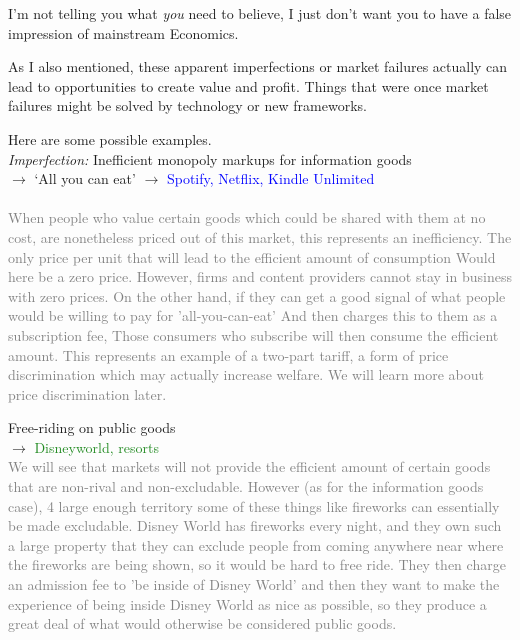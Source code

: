 \documentclass[]{article}
\begin{document}
I'm not telling you what \emph{you} need to believe, I just don't want
you to have a false impression of mainstream Economics.

As I also mentioned, these apparent imperfections or market failures
actually can lead to opportunities to create value and profit. Things
that were once market failures might be solved by technology or new
frameworks.

Here are some possible examples.\\

\emph{Imperfection:} Inefficient monopoly markups for information
goods\\

\(\rightarrow\) `All you can eat' \(\rightarrow\)
\textcolor{blue}{Spotify, Netflix, Kindle Unlimited}\\
~\\

\textcolor{gray}{When people who value certain goods which could be shared with them at no cost, are nonetheless priced out of this market, this represents an inefficiency. The only price per unit that will lead to the efficient amount of consumption Would here be a zero price. However, firms and content providers cannot stay in business with zero prices. On the other hand, if they can get a good signal of what people would be willing to pay for 'all-you-can-eat' And then charges this to them as a subscription fee, Those consumers who subscribe will then consume the efficient amount. This represents an example of a two-part tariff, a form of price discrimination which may actually increase welfare. We will learn more about price discrimination later.}

Free-riding on public goods\\

\(\rightarrow\) \textcolor{ForestGreen}{Disneyworld, resorts}\\

\textcolor{gray}{We will see that markets will not provide the efficient amount of certain goods that are non-rival and non-excludable. However (as for the information goods case), 4 large enough territory some of these things like fireworks can essentially be made excludable. Disney World has fireworks every night, and they own such a large property that they can exclude people from coming anywhere near where the fireworks are being shown, so it would be hard to free ride.  They then charge an admission fee to 'be inside of Disney World' and then they want to make the experience of being inside Disney World as nice as possible, so they produce a great deal of what would otherwise be considered public goods.}
\end{document}
